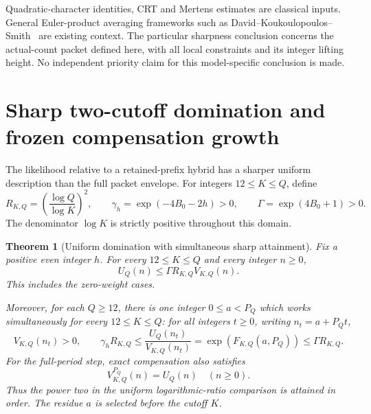 \documentclass[11pt]{article}
\newtheorem{theorem}{Theorem}[section]
\begin{document}
Quadratic-character identities, CRT and Mertens estimates are
classical inputs. General Euler-product averaging frameworks such as
David--Koukoulopoulos--Smith~\cite{DavidKoukoulopoulosSmith}
are existing context. The particular sharpness conclusion concerns
the actual-count packet defined here, with all local constraints
and its integer lifting height. No independent priority claim for
this model-specific conclusion is made.

\section{Sharp two-cutoff domination and frozen compensation growth}
\label{sec:sharpTwoCutoffGrowth}

The likelihood relative to a retained-prefix hybrid has a sharper
uniform description than the full packet envelope.
For integers \(12\leq K\leq Q\), define
\[
 R_{K,Q}=\left(\frac{\log Q}{\log K}\right)^2,\qquad
 \gamma_h=\exp(-4B_0-2h)>0,\qquad
 \Gamma=\exp(4B_0+1)>0.
\]
The denominator \(\log K\) is strictly positive throughout this domain.

\begin{theorem}[Uniform domination with simultaneous sharp attainment]
\label{thm:sharpTwoCutoffGrowth}
Fix a positive even integer \(h\). For every \(12\leq K\leq Q\)
and every integer \(n\geq0\),
\[
                       U_Q(n)\leq\Gamma R_{K,Q}V_{K,Q}(n).
\]
This includes the zero-weight cases.

Moreover, for each \(Q\geq12\), there is one integer \(0\leq a<P_Q\)
which works simultaneously for every \(12\leq K\leq Q\):
for all integers \(t\geq0\), writing \(n_t=a+P_Qt\),
\[
 V_{K,Q}(n_t)>0,\qquad
 \gamma_hR_{K,Q}
 \leq\frac{U_Q(n_t)}{V_{K,Q}(n_t)}
 =\exp(F_{K,Q}(a,P_Q))
 \leq\Gamma R_{K,Q}.
\]
For the full-period step, exact compensation also satisfies
\[
                         V^{P_Q}_{K,Q}(n)=U_Q(n)
                                     \quad(n\geq0).
\]
Thus the power two in the uniform logarithmic-ratio comparison is
attained in order. The residue \(a\) is selected before the cutoff \(K\).
\end{theorem}
\end{document}
